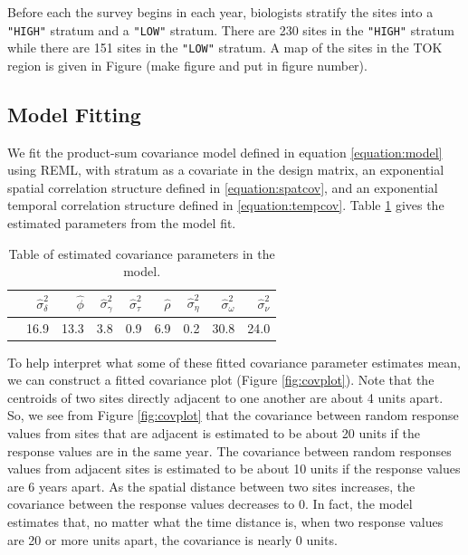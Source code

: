 \documentclass[]{interact}
\theoremstyle{plain}%
\theoremstyle{definition}
\theoremstyle{remark}
\begin{document}
Before each the survey begins in each year, biologists stratify the
sites into a \texttt{"HIGH"} stratum and a \texttt{"LOW"} stratum. There
are 230 sites in the \texttt{"HIGH"} stratum while there are 151 sites
in the \texttt{"LOW"} stratum. A map of the sites in the TOK region is
given in Figure (make figure and put in figure number).

\subsection{Model Fitting} \label{subsection:modelfit}

We fit the product-sum covariance model defined in equation
\ref{equation:model} using REML, with stratum as a covariate in the
design matrix, an exponential spatial correlation structure defined in
\ref{equation:spatcov}, and an exponential temporal correlation
structure defined in \ref{equation:tempcov}. Table \ref{paramest} gives
the estimated parameters from the model fit.

\begin{table}[ht]
\centering
\begin{tabular}{rrrrrrrrr}
  \hline
 & $\hat{\sigma}^2_{\delta}$ & $\hat{\phi}$ & $\hat{\sigma}^2_{\gamma}$ & $\hat{\sigma}^2_{\tau}$ & $\hat{\rho}$ & $\hat{\sigma}^2_{\eta}$ & $\hat{\sigma}^2_{\omega}$ & $\hat{\sigma}^2_{\nu}$ \\ 
  \hline
 & 16.9 & 13.3 & 3.8 & 0.9 & 6.9 & 0.2 & 30.8 & 24.0 \\ 
   \hline
\end{tabular}
\caption{Table of estimated covariance parameters in the model.} 
\label{paramest}
\end{table}

To help interpret what some of these fitted covariance parameter
estimates mean, we can construct a fitted covariance plot (Figure
\ref{fig:covplot}). Note that the centroids of two sites directly
adjacent to one another are about 4 units apart. So, we see from Figure
\ref{fig:covplot} that the covariance between random response values
from sites that are adjacent is estimated to be about 20 units if the
response values are in the same year. The covariance between random
responses values from adjacent sites is estimated to be about 10 units
if the response values are 6 years apart. As the spatial distance
between two sites increases, the covariance between the response values
decreases to 0. In fact, the model estimates that, no matter what the
time distance is, when two response values are 20 or more units apart,
the covariance is nearly 0 units.
\end{document}
